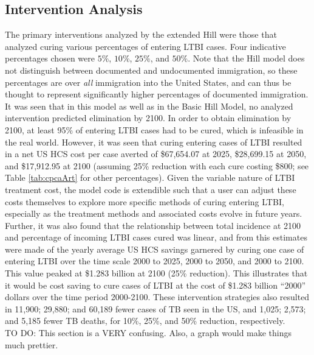 \documentclass{amsart}
\newcommand{\TODO}[1]{\hfill\\{\huge \color{red} TO DO:} #1 \hfill \\}
\begin{document}
\subsection{Intervention Analysis}
The primary interventions analyzed by the extended Hill were those that analyzed
curing various percentages of entering LTBI cases. Four indicative percentages
chosen were $5\%$, $10\%$, $25\%$, and $50\%$. Note that the Hill model does not
distinguish between documented and undocumented immigration, so these
percentages are over \emph{all} immigration into the United States, and can thus
be thought to represent significantly higher percentages of documented
immigration. It was seen that in this model as well as in the Basic Hill Model,
no analyzed intervention predicted elimination by 2100. In order to obtain
elimination by 2100, at least 95\% of entering LTBI cases had to be cured, which
is infeasible in the real world. However, it was seen that curing entering cases of
LTBI resulted in a net US HCS cost per case averted of \$67,654.07 at 2025, \$28,699.15 at 2050,
and \$17,912.95 at 2100 (assuming 25\% reduction with each cure costing \$800; see Table
\ref{tab:cpcaArt} for other percentages). Given the variable nature of LTBI
treatment cost, the model code is extendible such that a user can adjust these
costs themselves to explore more specific methods of curing entering LTBI,
especially as the treatment methods and associated costs evolve in future years.
Further, it was also found that the relationship between total incidence at 2100
and percentage of incoming LTBI cases cured was linear, and from this estimates
were made of the yearly average US HCS savings garnered by curing one case of
entering LTBI over the time scale 2000 to 2025, 2000 to 2050, and 2000 to 2100.
This value peaked at \$1.283 billion at 2100 (25\% reduction). This illustrates
that it would be cost saving to cure cases of LTBI at the cost of \$1.283
billion ``2000'' dollars over the time period 2000-2100. These intervention
strategies also resulted in 11,900; 29,880; and 60,189 fewer cases of TB seen in
the US, and 1,025; 2,573; and 5,185 fewer TB deaths, for 10\%, 25\%, and 50\%
reduction, respectively.
\TODO{This section is a VERY confusing. Also, a graph would make things much
prettier.}
\end{document}

